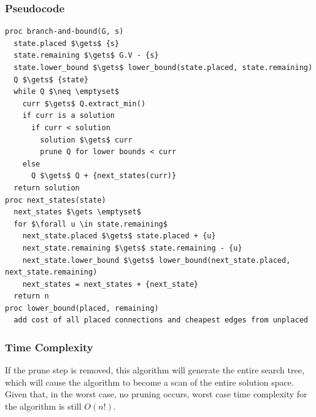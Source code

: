 \documentclass[a4paper,12pt]{article}
\begin{document}
\subsubsection{Pseudocode}
\begin{lstlisting}[mathescape=true]
proc branch-and-bound(G, s)
  state.placed $\gets$ {s}
  state.remaining $\gets$ G.V - {s}
  state.lower_bound $\gets$ lower_bound(state.placed, state.remaining)
  Q $\gets$ {state}
  while Q $\neq \emptyset$
    curr $\gets$ Q.extract_min()
    if curr is a solution
      if curr < solution
        solution $\gets$ curr
        prune Q for lower bounds < curr
    else
      Q $\gets$ Q + {next_states(curr)}
  return solution
proc next_states(state)
  next_states $\gets \emptyset$
  for $\forall u \in state.remaining$
    next_state.placed $\gets$ state.placed + {u}
    next_state.remaining $\gets$ state.remaining - {u}
    next_state.lower_bound $\gets$ lower_bound(next_state.placed, next_state.remaining)
    next_states = next_states + {next_state}
  return n
proc lower_bound(placed, remaining)
  add cost of all placed connections and cheapest edges from unplaced
\end{lstlisting}
\subsubsection{Time Complexity}
If the prune step is removed, this algorithm will generate the entire search tree, which will cause the algorithm to become a scan of the entire solution space. Given that, in the worst case, no pruning occurs, worst case time complexity for the algorithm is still $O(n!)$.
\end{document}
